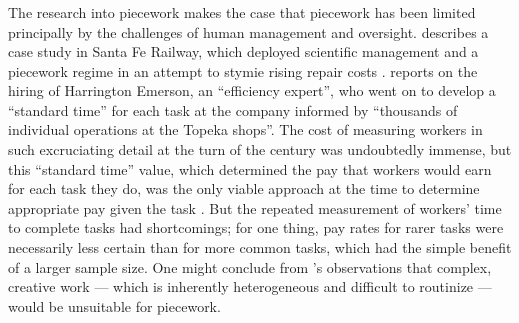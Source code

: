 \documentclass[trackingWork]{subfiles}
\begin{document}
\subsubsection{\pieceworkpers}
The research into piecework makes the case that
piecework has been limited principally by the challenges of human management and oversight.
\citeauthor{10.2307/23702539} describes a case study in Santa Fe Railway, which
deployed scientific management and a piecework regime in an attempt to stymie rising repair costs
\cite{10.2307/23702539}.
\citeauthor{10.2307/23702539} reports on the hiring of Harrington Emerson,
an ``efficiency expert'', who went on to develop a ``standard time'' for each task at the company
informed by ``thousands of individual operations at the Topeka shops''.
The cost of measuring workers in such excruciating detail at the turn of the  century was undoubtedly immense,
but this ``standard time'' value, which determined the pay that workers would earn for each task they do,
was the only viable approach at the time to determine appropriate pay given the task
\cite{10.2307/23702539}.
But the repeated measurement of workers' time to complete tasks had shortcomings;
for one thing, pay rates for rarer tasks
were necessarily less certain than for more common tasks,
which had the simple benefit of a larger sample size.
One might conclude from \citeauthor{10.2307/23702539}'s observations that
complex, creative work --- which is inherently heterogeneous and difficult to routinize ---
would be unsuitable for piecework.
\end{document}
